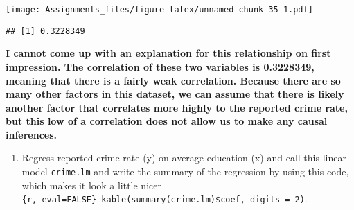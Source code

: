 \documentclass[
]{article}
\newenvironment{Shaded}{\begin{snugshade}}{\end{snugshade}}
\newcommand{\AttributeTok}[1]{\textcolor[rgb]{0.77,0.63,0.00}{#1}}
\newcommand{\CommentTok}[1]{\textcolor[rgb]{0.56,0.35,0.01}{\textit{#1}}}
\newcommand{\ConstantTok}[1]{\textcolor[rgb]{0.00,0.00,0.00}{#1}}
\newcommand{\DecValTok}[1]{\textcolor[rgb]{0.00,0.00,0.81}{#1}}
\newcommand{\FunctionTok}[1]{\textcolor[rgb]{0.00,0.00,0.00}{#1}}
\newcommand{\NormalTok}[1]{#1}
\newcommand{\OtherTok}[1]{\textcolor[rgb]{0.56,0.35,0.01}{#1}}
\newcommand{\SpecialCharTok}[1]{\textcolor[rgb]{0.00,0.00,0.00}{#1}}
\providecommand{\tightlist}{%
  \setlength{\itemsep}{0pt}\setlength{\parskip}{0pt}}
\begin{document}
\texttt{[image: Assignments\_files/figure-latex/unnamed-chunk-35-1.pdf]}

\begin{Shaded}
\end{Shaded}

\begin{verbatim}
## [1] 0.3228349
\end{verbatim}

\textbf{I cannot come up with an explanation for this relationship on
first impression. The correlation of these two variables is 0.3228349,
meaning that there is a fairly weak correlation. Because there are so
many other factors in this dataset, we can assume that there is likely
another factor that correlates more highly to the reported crime rate,
but this low of a correlation does not allow us to make any causal
inferences.}

\begin{enumerate}
\def\labelenumi{\arabic{enumi}.}
\setcounter{enumi}{2}
\tightlist
\item
  Regress reported crime rate (y) on average education (x) and call this
  linear model \texttt{crime.lm} and write the summary of the regression
  by using this code, which makes it look a little nicer
  \texttt{\{r,\ eval=FALSE\}\ kable(summary(crime.lm)\$coef,\ digits\ =\ 2)}.
\end{enumerate}

\begin{Shaded}
\end{Shaded}
\end{document}
